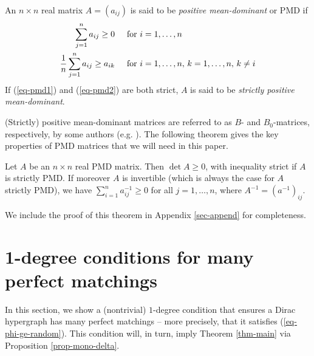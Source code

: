 \documentclass[11pt]{article}
\begin{document}
\begin{definition}\label{def-pmd}
    An $n\times n$ real matrix $A=(a_{ij})$ is said to be \emph{positive mean-dominant} or PMD if
    \begin{align}
        \sum_{j=1}^n a_{ij}\ge 0\hspace{0.5cm}&\text{for } i=1,\dots,n\label{eq-pmd1} \\
        \frac{1}{n}\sum_{j=1}^n a_{ij}\ge a_{ik} \hspace{0.5cm} &\text{for } i=1,\dots,n,\,k=1,\dots,n, \,k\neq i \label{eq-pmd2}
    \end{align}
    If (\ref{eq-pmd1}) and (\ref{eq-pmd2}) are both strict, $A$ is said to be \emph{strictly positive mean-dominant}.
\end{definition}

(Strictly) positive mean-dominant matrices are referred to as $B$- and $B_0$-matrices, respectively, by some authors (e.g. \cite{christensen2019comparative,pena2001class}). The following theorem gives the key properties of PMD matrices that we will need in this paper.

\begin{theorem}\label{thm-pmd}
    Let $A$ be an $n\times n$ real PMD matrix. Then $\det A\ge 0$, with inequality strict if $A$ is strictly PMD. If moreover $A$ is invertible (which is always the case for $A$ strictly PMD), we have $\sum_{i=1}^n a^{-1}_{ij}\ge0$ for all $j=1,\dots,n$, where $A^{-1}=(a^{-1})_{ij}$.
\end{theorem}

We include the proof of this theorem in Appendix \ref{sec-append} for completeness.

\section{1-degree conditions for many perfect matchings}\label{sec-1-deg-conditions}

In this section, we show a (nontrivial) $1$-degree condition that ensures a Dirac hypergraph has many perfect matchings -- more precisely, that it satisfies (\ref{eq-phi-ge-random}). This condition will, in turn, imply Theorem \ref{thm-main} via Proposition \ref{prop-mono-delta}.
\end{document}

